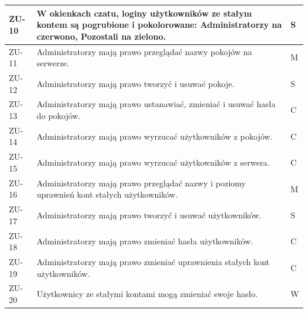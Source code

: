 \begin{tabular}{ | l | l | l | }
    \hline
    ZU-10 & \parbox[t]{14cm}{
      W okienkach czatu, loginy użytkowników ze stałym kontem są pogrubione i pokolorowane: Administratorzy na czerwono,
      Pozostali na zielono. 
      } & S \\

    \hline
    ZU-11 & \parbox[t]{14cm}{
      Administratorzy mają prawo przeglądać nazwy pokojów na serwerze. 
    } & M \\

    \hline
    ZU-12 & \parbox[t]{14cm}{
      Administratorzy mają prawo tworzyć i usuwać pokoje. 
    } & S \\

    \hline
    ZU-13 & \parbox[t]{14cm}{
      Administratorzy mają prawo ustanawiać, zmieniać i usuwać hasła do pokojów. 
    } & C \\

    \hline
    ZU-14 & \parbox[t]{14cm}{
      Administratorzy mają prawo wyrzucać użytkowników z pokojów. 
    } & C \\

    \hline
    ZU-15 & \parbox[t]{14cm}{
      Administratorzy mają prawo wyrzucać użytkowników z serwera. 
    } & C \\

    \hline
    ZU-16 & \parbox[t]{14cm}{
      Administratorzy mają prawo przeglądać nazwy i poziomy uprawnień kont stałych użytkowników. 
    } & M \\

    \hline
    ZU-17 & \parbox[t]{14cm}{
      Administratorzy mają prawo tworzyć i usuwać użytkowników. 
    } & S \\

    \hline
    ZU-18 & \parbox[t]{14cm}{
      Administratorzy mają prawo zmieniać hasła użytkowników. 
    } & C \\

    \hline
    ZU-19 & \parbox[t]{14cm}{
      Administratorzy mają prawo zmieniać uprawnienia stałych kont użytkowników. 
    } & C \\

    \hline
    ZU-20 & \parbox[t]{14cm}{
      Użytkownicy ze stałymi kontami mogą zmieniać swoje hasło.
    } & W \\

    
    \hline
  \end{tabular}


